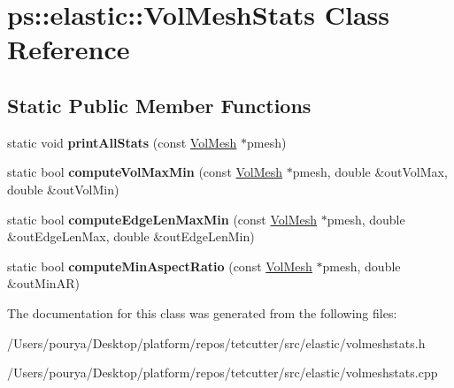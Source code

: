 \hypertarget{classps_1_1elastic_1_1VolMeshStats}{}\section{ps\+:\+:elastic\+:\+:Vol\+Mesh\+Stats Class Reference}
\label{classps_1_1elastic_1_1VolMeshStats}
\subsection*{Static Public Member Functions}
\begin{DoxyCompactItemize}
\item 
\hypertarget{classps_1_1elastic_1_1VolMeshStats_ad923c2df9b27a808e570af1e1a8e2015}{}static void {\bfseries print\+All\+Stats} (const \hyperlink{classps_1_1elastic_1_1VolMesh}{Vol\+Mesh} $\ast$pmesh)\label{classps_1_1elastic_1_1VolMeshStats_ad923c2df9b27a808e570af1e1a8e2015}

\item 
\hypertarget{classps_1_1elastic_1_1VolMeshStats_af1f7ee761d346b7a7080e1f40f5a384c}{}static bool {\bfseries compute\+Vol\+Max\+Min} (const \hyperlink{classps_1_1elastic_1_1VolMesh}{Vol\+Mesh} $\ast$pmesh, double \&out\+Vol\+Max, double \&out\+Vol\+Min)\label{classps_1_1elastic_1_1VolMeshStats_af1f7ee761d346b7a7080e1f40f5a384c}

\item 
\hypertarget{classps_1_1elastic_1_1VolMeshStats_a788ed45c6aa71ebc93427b7b141ca2c6}{}static bool {\bfseries compute\+Edge\+Len\+Max\+Min} (const \hyperlink{classps_1_1elastic_1_1VolMesh}{Vol\+Mesh} $\ast$pmesh, double \&out\+Edge\+Len\+Max, double \&out\+Edge\+Len\+Min)\label{classps_1_1elastic_1_1VolMeshStats_a788ed45c6aa71ebc93427b7b141ca2c6}

\item 
\hypertarget{classps_1_1elastic_1_1VolMeshStats_a615ae4c1ceb95720af44a1545d70f15c}{}static bool {\bfseries compute\+Min\+Aspect\+Ratio} (const \hyperlink{classps_1_1elastic_1_1VolMesh}{Vol\+Mesh} $\ast$pmesh, double \&out\+Min\+A\+R)\label{classps_1_1elastic_1_1VolMeshStats_a615ae4c1ceb95720af44a1545d70f15c}

\end{DoxyCompactItemize}


The documentation for this class was generated from the following files\+:\begin{DoxyCompactItemize}
\item 
/\+Users/pourya/\+Desktop/platform/repos/tetcutter/src/elastic/volmeshstats.\+h\item 
/\+Users/pourya/\+Desktop/platform/repos/tetcutter/src/elastic/volmeshstats.\+cpp\end{DoxyCompactItemize}
